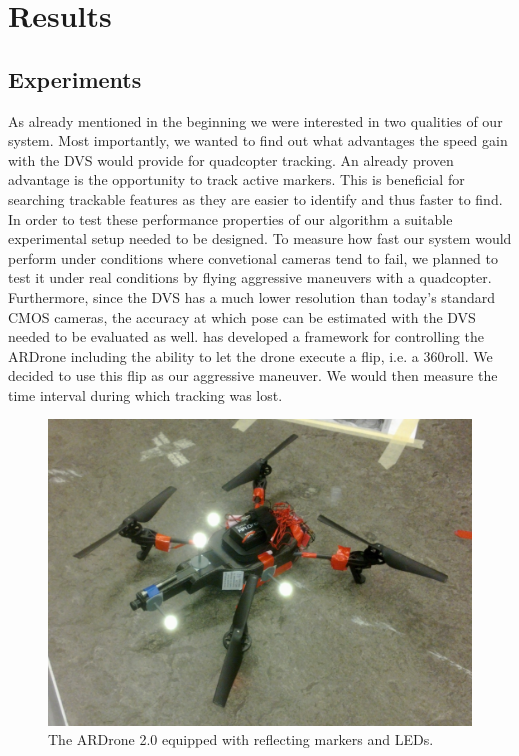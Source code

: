 \chapter{Results}\label{sec:results}

\section{Experiments}\label{sec:experiments}

As already mentioned in the beginning we were interested in two qualities of our system. Most importantly, we wanted to find out what advantages the speed gain with the DVS would provide for quadcopter tracking. An already proven advantage is the opportunity to track active markers.  This is beneficial for searching trackable features as they are easier to identify and thus faster to find. In order to test these performance properties of our algorithm a suitable experimental setup needed to be designed. To measure how fast our system would perform under conditions where convetional cameras tend to fail, we planned to test it under real conditions by flying aggressive maneuvers with a quadcopter. Furthermore, since the DVS has a much lower resolution than today's standard CMOS cameras, the accuracy at which pose can be estimated with the DVS needed to be evaluated as well. \cite{Saner} has developed a framework for controlling the ARDrone including the ability to let the drone execute a flip, i.e. a 360\degree roll. We decided to use this flip as our aggressive maneuver. We would then measure the time interval during which tracking was lost.


\begin{figure}[h]
     \centering
     \includegraphics[height=0.5\textwidth]{img/marked_quadrotor.jpg}
     \caption{The ARDrone 2.0 equipped with reflecting markers and LEDs.}
     \label{img:marked_quadrotor}
\end{figure}

